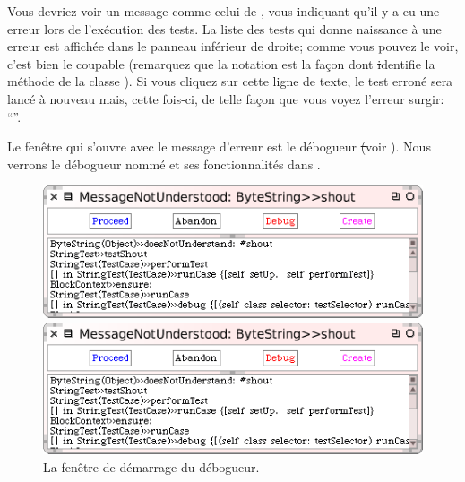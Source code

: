\documentclass[a4paper,10pt,twoside]{book}
\begin{document}
Vous devriez voir un message comme celui de
, vous indiquant qu'il y a eu une erreur
lors de l'ex\'ecution des tests. La liste des tests qui donne
naissance \`a une erreur est affich\'ee dans le panneau inf\'erieur de
droite; comme vous pouvez le voir, c'est bien
 le coupable
(remarquez que la notation  est la fa\c{c}on dont \st
identifie la m\'ethode de la classe ).
Si vous cliquez sur cette ligne de texte, le test erron\'e sera
lanc\'e \`a nouveau mais, cette fois-ci, de telle fa\c{c}on que vous
voyez l'erreur surgir:
``''.

Le fen\^etre qui s'ouvre avec le message d'erreur est le d\'ebogueur \st (voir ).
Nous verrons le d\'ebogueur nomm\'e  et ses
fonctionnalit\'es dans .

\begin{figure}[hbt]
\ifluluelse
	{\centerline {\includegraphics[width=\textwidth]{Predebugger}}}
	{\centerline {\includegraphics[scale=0.7]{Predebugger}}}
\caption{La fenêtre de démarrage du d\'ebogueur.}
\label{fig:predebugger}
\end{figure}
\end{document}
